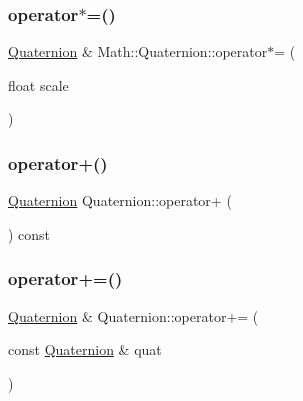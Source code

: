 \mbox{\label{struct_math_1_1_quaternion_a138f8b4c70cf0280ad19072c675201ab}} 
\subsubsection{\texorpdfstring{operator$\ast$=()}{operator*=()}\hspace{0.1cm}{\footnotesize\ttfamily [2/2]}}
{\footnotesize\ttfamily \mbox{\hyperlink{struct_math_1_1_quaternion}{Quaternion}} \& Math\+::\+Quaternion\+::operator$\ast$= (\begin{DoxyParamCaption}\item[{float}]{scale }\end{DoxyParamCaption})}

\mbox{\label{struct_math_1_1_quaternion_aa22c281886948b07c70b35e0de42dc39}} 
\subsubsection{\texorpdfstring{operator+()}{operator+()}}
{\footnotesize\ttfamily \mbox{\hyperlink{struct_math_1_1_quaternion}{Quaternion}} Quaternion\+::operator+ (\begin{DoxyParamCaption}{ }\end{DoxyParamCaption}) const}

\mbox{\label{struct_math_1_1_quaternion_a089bf5e8aa4d7441b364f2b7f34a64ac}} 
\subsubsection{\texorpdfstring{operator+=()}{operator+=()}}
{\footnotesize\ttfamily \mbox{\hyperlink{struct_math_1_1_quaternion}{Quaternion}} \& Quaternion\+::operator+= (\begin{DoxyParamCaption}\item[{const \mbox{\hyperlink{struct_math_1_1_quaternion}{Quaternion}} \&}]{quat }\end{DoxyParamCaption})}

